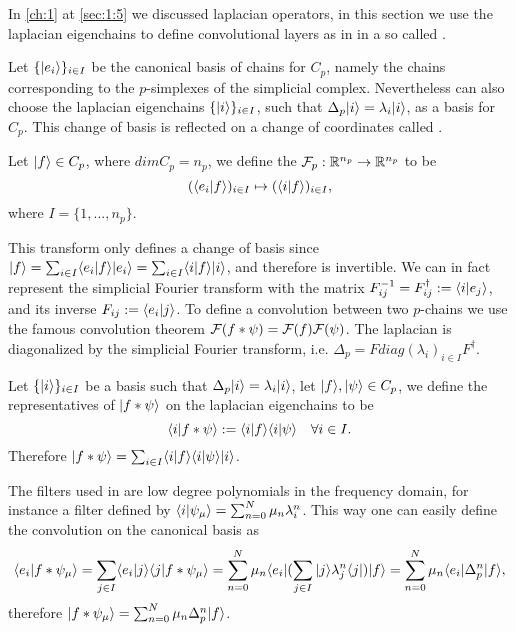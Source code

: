 \documentclass[../3.tex]{subfiles}
\begin{document}
    In \autoref{ch:1} at \autoref{sec:1:5} we discussed laplacian operators, in this section we use the laplacian 
    eigenchains to define convolutional layers as in \cite{simplicialNN} in a so called . 

    Let $\{| e_i \rangle\}_{i \in I}$ be the canonical basis of chains for $C_p$, namely the chains corresponding to the $p$-simplexes of the simplicial complex.
    Nevertheless can also choose the laplacian eigenchains $\{| i \rangle\}_{i \in I}$, such that $\Delta_p| i \rangle = \lambda_i| i \rangle$, as a basis for $C_p$. This change of basis
    is reflected on a change of coordinates called .

    \begin{defn}
        Let $| f \rangle \in C_p$, where $dimC_p = n_p$, we define the  $\mathcal{F}_p : \mathbb{R}^{n_p} \to \mathbb{R}^{n_p}$ to be
        \[ (\langle e_i | f \rangle)_{i \in I} \mapsto (\langle i | f \rangle)_{i \in I},\]
        where $I = \{1,...,n_p\}$.
    \end{defn}

    This transform only defines a change of basis since $| f \rangle = \sum_{i \in I}\langle e_i | f \rangle| e_i \rangle = \sum_{i \in I}\langle i | f \rangle| i \rangle$, and therefore is invertible.
    We can in fact represent the simplicial Fourier transform with the matrix $F^{-1}_{ij} = F^\dagger_{ij} := \langle i | e_j \rangle$, and its inverse $F_{ij} := \langle e_i | j \rangle$.
    To define a convolution between two $p$-chains we use the famous convolution theorem $\mathcal{F}(f * \psi) = \mathcal{F}(f)\mathcal{F}(\psi)$. The laplacian is diagonalized by the simplicial
    Fourier transform, i.e. $\Delta_p = F diag(\lambda_i)_{i \in I} F^\dagger$.

    \begin{defn}
        Let $\{| i \rangle\}_{i \in I}$ be a basis such that $\Delta_p| i \rangle = \lambda_i| i \rangle$, let $| f \rangle,| \psi \rangle \in C_p$, we define the representatives of $| f * \psi \rangle$ on
        the laplacian eigenchains to be 
        \[ \langle i | f * \psi \rangle := \langle i | f \rangle\langle i | \psi \rangle \quad \forall i \in I.\]
        Therefore $| f * \psi \rangle = \sum_{i \in I}\langle i | f \rangle\langle i | \psi \rangle| i \rangle$.
    \end{defn}

    The filters used in \cite{simplicialNN} are low degree polynomials in the frequency domain, for instance a filter defined by $\langle i | \psi_\mu \rangle = \sum_{n = 0}^N \mu_n \lambda_i^n$.
    This way one can easily define the convolution on the canonical basis as 
    \[\langle e_i | f * \psi_\mu \rangle = \sum_{j \in I}\langle e_i | j \rangle\langle j | f*\psi_\mu \rangle = \sum_{n = 0}^N\mu_n \langle e_i |(\sum_{j \in I}| j \rangle\lambda_j^n\langle j |)| f \rangle
     = \sum_{n=0}^N \mu_n \langle e_i |\Delta_p^n| f \rangle,\]
    therefore $| f*\psi_\mu \rangle = \sum_{n = 0}^N \mu_n \Delta_p^n| f \rangle$.
\end{document}
